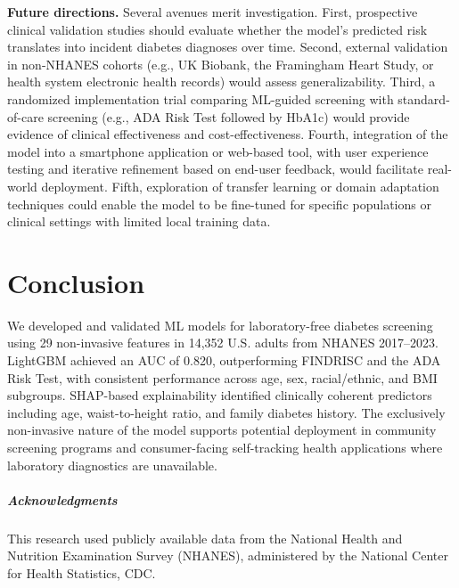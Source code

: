 \documentclass{amia}
\begin{document}
\textbf{Future directions.} Several avenues merit investigation. First, prospective clinical validation studies should evaluate whether the model's predicted risk translates into incident diabetes diagnoses over time. Second, external validation in non-NHANES cohorts (e.g., UK Biobank, the Framingham Heart Study, or health system electronic health records) would assess generalizability. Third, a randomized implementation trial comparing ML-guided screening with standard-of-care screening (e.g., ADA Risk Test followed by HbA1c) would provide evidence of clinical effectiveness and cost-effectiveness. Fourth, integration of the model into a smartphone application or web-based tool, with user experience testing and iterative refinement based on end-user feedback, would facilitate real-world deployment. Fifth, exploration of transfer learning or domain adaptation techniques could enable the model to be fine-tuned for specific populations or clinical settings with limited local training data.

\section*{Conclusion}

We developed and validated ML models for laboratory-free diabetes screening using 29 non-invasive features in 14,352 U.S. adults from NHANES 2017--2023. LightGBM achieved an AUC of 0.820, outperforming FINDRISC and the ADA Risk Test, with consistent performance across age, sex, racial/ethnic, and BMI subgroups. SHAP-based explainability identified clinically coherent predictors including age, waist-to-height ratio, and family diabetes history. The exclusively non-invasive nature of the model supports potential deployment in community screening programs and consumer-facing self-tracking health applications where laboratory diagnostics are unavailable.

\subparagraph{Acknowledgments} This research used publicly available data from the National Health and Nutrition Examination Survey (NHANES), administered by the National Center for Health Statistics, CDC.

\makeatletter
\renewcommand{\@biblabel}[1]{\hfill #1.}
\makeatother



\end{document}
